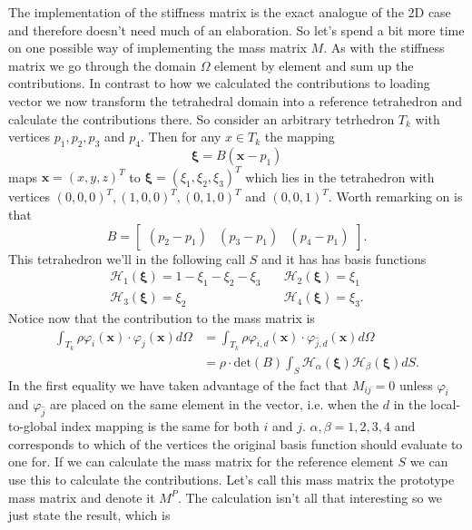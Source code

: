 \documentclass[paper=a4, fontsize=11pt]{scrartcl} %
\begin{document}
The implementation of the stiffness matrix is the exact analogue of the 2D case and therefore doesn't need much of an elaboration. So let's spend a bit more time on one possible way of implementing the mass matrix $M$. As with the stiffness matrix we go through the domain $\Omega$ element by element and sum up the contributions. In contrast to how we calculated the contributions to loading vector we now transform the tetrahedral domain into a reference tetrahedron and calculate the contributions there. So consider an arbitrary tetrhedron $T_k$ with vertices $p_1, p_2, p_3$ and $p_4$. Then for any $x\in T_k$ the mapping
\begin{equation*}
\boldsymbol{\xi} = B(\boldsymbol{x}-p_1)
\end{equation*}
maps $\boldsymbol{x}=(x,y,z)^T$ to $\boldsymbol{\xi}=(\xi_1,\xi_2,\xi_3)^T$ which lies in the tetrahedron with vertices $(0,0,0)^T,(1,0,0)^T,(0,1,0)^T$ and $(0,0,1)^T$. Worth remarking on is that
\begin{equation}
B = \begin{bmatrix}
(p_2 - p_1) & (p_3-p_1) & (p_4-p_1)
\end{bmatrix}.
\end{equation} This tetrahedron we'll in the following call $S$ and it has has basis functions
\begin{align*}
\mathcal{H}_1(\boldsymbol{\xi}) = 1-\xi_1-\xi_2 - \xi_3 &\quad \mathcal{H}_2(\boldsymbol{\xi}) = \xi_1 \\
\mathcal{H}_3(\boldsymbol{\xi}) = \xi_2 &\quad \mathcal{H}_4(\boldsymbol{\xi}) = \xi_3.
\end{align*}
Notice now that the contribution to the mass matrix is
\begin{align*}
\int_{T_k}\rho \varphi_i(\boldsymbol{x})\cdot \varphi_j(\boldsymbol{x})d\Omega &= \int_{T_k}\rho \varphi_{\hat{i},d}(\boldsymbol{x})\cdot \varphi_{\hat{j},d}(\boldsymbol{x})d\Omega \\
&= \rho\cdot \text{det}(B)\int_S\mathcal{H}_{\alpha}(\boldsymbol{\xi})\mathcal{H}_{\beta}(\boldsymbol{\xi})dS.
\end{align*}
In the first equality we have taken advantage of the fact that $M_{ij}=0$ unless $\varphi_{\hat{i}}$ and $\varphi_{\hat{j}}$ are placed on the same element in the vector, i.e. when the $d$ in the local-to-global index mapping is the same for both $i$ and $j$. $\alpha, \beta = 1,2,3,4$ and corresponds to which of the vertices the original basis function should evaluate to one for. If we can calculate the mass matrix for the reference element $S$ we can use this to calculate the contributions. Let's call this mass matrix the prototype mass matrix and denote it $M^P$. The calculation isn't all that interesting so we just state the result, which is
\end{document}
